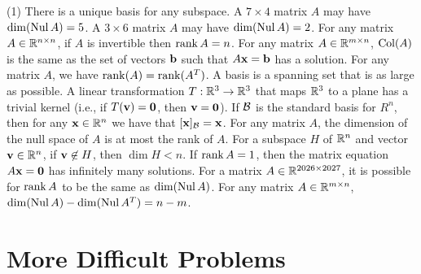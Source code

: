 \begin{tasks}[resume, style=enumerate](1)
\task
  There is a unique basis for any subspace.
\task
  A $7 \times 4$ matrix $A$ may have $\dim(\operatorname{\mathrm{Nul}} A) = 5$.
\task
  A $3 \times 6$ matrix $A$ may have $\dim(\operatorname{\mathrm{Nul}} A) = 2$.
\task
  For any matrix $A \in \mathbb R^{n \times n}$, if $A$ is invertible then
  $\operatorname{\mathrm{rank}} A = n$.
\task
  For any matrix $A \in \mathbb R^{m \times n}$, $\operatorname{\mathrm{Col}}(A)$ is the same as the
  set of vectors $\mathbf b$ such that $A \mathbf x = \mathbf b$ has a solution.
\task
  For any matrix $A$, we have $\operatorname{\mathrm{rank}}(A) = \operatorname{\mathrm{rank}}(A^T)$.
\task
  A basis is a spanning set that is as large as possible.
\task
  A linear transformation $T: \mathbb R^3 \to \mathbb R^3$ that maps $\mathbb R^3$ to a
  plane has a trivial kernel (i.e., if $T(\mathbf v) = \mathbf 0$, then $\mathbf v =
  \mathbf 0$).
\task
  If $\mathcal B$ is the standard basis for $R^n$, then for any $\mathbf x \in
  \mathbb R^n$ we have that $[\mathbf x]_{\mathcal B} = \mathbf x$.
\task
  For any matrix $A$, the dimension of the null space of $A$ is at
  most the rank of $A$.
\task
  For a subspace $H$ of $\mathbb R^n$ and vector $\mathbf v \in \mathbb R^n$, if $\mathbf v
  \not\in H$, then $\dim H < n$.
\task
  If $\operatorname{\mathrm{rank}} A = 1$, then the matrix equation $A \mathbf x = \mathbf 0$ has
  infinitely many solutions.
\task
  For a matrix $A \in \mathbb R^{2026 \times 2027}$, it is possible for
  $\operatorname{\mathrm{rank}} A$ to be the same as $\dim(\operatorname{\mathrm{Nul}} A)$.
\task
  For any matrix $A \in \mathbb R^{m \times n}$, $\dim(\operatorname{\mathrm{Nul}} A) - \dim(\operatorname{\mathrm{Nul}} A^T) = n - m$.
\end{tasks}

\section{More Difficult Problems}


